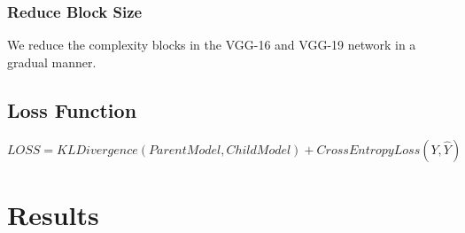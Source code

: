 \documentclass[a4paper,twocolumn]{article}
\begin{document}
\subsubsection*{Reduce Block Size}
\label{sec-4-2-2}
We reduce the complexity blocks in the VGG-16 and VGG-19 network in a gradual manner.


\subsection{Loss Function}
\label{sec-4-3}

\( LOSS = KLDivergence(ParentModel, ChildModel) + CrossEntropyLoss(Y, \hat{Y}) \)


\section{Results}
\label{sec-5}
\end{document}
